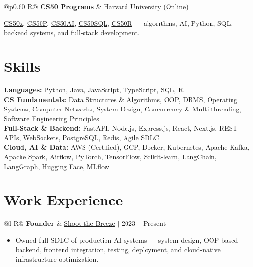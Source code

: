 \documentclass[a4paper,10pt]{article}
\newcommand{\ulink}[2]{\href{#1}{\uline{#2}}}
\newcommand{\subheading}[1]{{\color[HTML]{0A0A0A}\fontsize{12}{14}\selectfont\bfseries #1}}
\newcommand{\meta}[1]{{\color[HTML]{5C5C5C}\fontsize{10.5}{12.5}\selectfont #1}}
\begin{document}
\begin{tabularx}{\linewidth}{@{}p{0.60\linewidth} R@{}}
\subheading{CS50 Programs} & \meta{Harvard University (Online)}
\end{tabularx}
\vspace{1pt}
{\color[HTML]{3A3A3A}\fontsize{11}{14}\selectfont \ulink{https://cs50.harvard.edu/certificates/b14b78df-e05c-413e-a607-1dd27303053a}{CS50x}, \ulink{https://cs50.harvard.edu/certificates/32477052-9db4-49c4-a5a4-d7e58429ca2c}{CS50P}, \ulink{https://cs50.harvard.edu/certificates/9cdb4d4a-1250-4f8e-9fd7-191864e0f919}{CS50AI}, \ulink{https://cs50.harvard.edu/certificates/bc486f24-f085-4e61-8536-80940b97a1b9}{CS50SQL}, \ulink{https://cs50.harvard.edu/certificates/666838e6-a053-4d82-b179-a60fe745fd84}{CS50R} --- algorithms, AI, Python, SQL, backend systems, and full-stack development.}

\vspace{2pt}

\section{Skills}
\vspace{3pt}
{\color[HTML]{0A0A0A}\fontsize{11}{14}\selectfont
\textbf{Languages:} Python, Java, JavaScript, TypeScript, SQL, R \\[2pt]
\textbf{CS Fundamentals:} Data Structures \& Algorithms, OOP, DBMS, Operating Systems, Computer Networks, System Design, Concurrency \& Multi-threading, Software Engineering Principles \\[2pt]
\textbf{Full-Stack \& Backend:} FastAPI, Node.js, Express.js, React, Next.js, REST APIs, WebSockets, PostgreSQL, Redis, Agile SDLC \\[2pt]
\textbf{Cloud, AI \& Data:} AWS (Certified), GCP, Docker, Kubernetes, Apache Kafka, Apache Spark, Airflow, PyTorch, TensorFlow, Scikit-learn, LangChain, LangGraph, Hugging Face, MLflow}

\vspace{2pt}

\section{Work Experience}
\vspace{2pt}

\begin{tabularx}{\linewidth}{@{}l R@{}}
\subheading{Founder} & \meta{\ulink{https://shoot-the-breeze.vercel.app}{Shoot the Breeze} $|$ 2023 -- Present}
\end{tabularx}
\begin{itemize}[nosep, leftmargin=1.5em, itemsep=1pt, topsep=2pt]
  \item {\color[HTML]{0A0A0A}\fontsize{11}{14}\selectfont Owned full SDLC of production AI systems — system design, OOP-based backend, frontend integration, testing, deployment, and cloud-native infrastructure optimization.}
\end{itemize}
\end{document}
